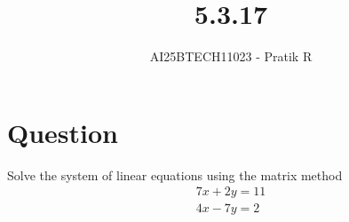 \documentclass[journal]{IEEEtran}
\begin{document}

\vspace{3cm}

\title{5.3.17}
\author{AI25BTECH11023 - Pratik R}
{\let\newpage\relax\maketitle}

\renewcommand{\thefigure}{\theenumi}
\renewcommand{\thetable}{\theenumi}
\setlength{\intextsep}{10pt} %


\renewcommand{\thetable}{\theenumi}


\section*{\textbf{Question}}
Solve the system of linear equations using the matrix method 
\begin{align}
    7x+2y=11 \\
    4x-7y=2
\end{align}
\end{document}
